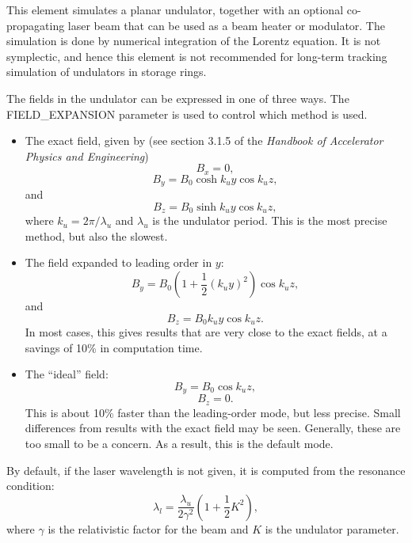 This element simulates a planar undulator, together with an optional
co-propagating laser beam that can be used as a beam heater or
modulator.  The simulation is done by numerical integration of the
Lorentz equation.  It is not symplectic, and hence this element is not
recommended for long-term tracking simulation of undulators in storage
rings.  

The fields in the undulator can be expressed in one of three ways.
The FIELD\_EXPANSION parameter is used to control which method is used.
\begin{itemize}
\item The exact field, given by (see section 3.1.5 of the {\em Handbook of
Accelerator Physics and Engineering})
\begin{equation}
B_x = 0,
\end{equation}
\begin{equation}
B_y = B_0 \cosh k_u y \cos k_u z,
\end{equation}
and
\begin{equation}
B_z = B_0 \sinh k_u y \cos k_u z ,
\end{equation}
where $k_u = 2\pi/\lambda_u$ and $\lambda_u$ is the undulator period.
This is the most precise method, but also the slowest.  

\item The field expanded to leading order in $y$:
\begin{equation}
B_y = B_0 ( 1 + \frac{1}{2}(k_u y)^2 ) \cos k_u z,
\end{equation}
and
\begin{equation}
B_z = B_0 k_u y \cos k_u z.
\end{equation}
In most cases, this gives results that are very close to the exact fields,
at a savings of 10\% in computation time.

\item The ``ideal'' field:
\begin{equation}
B_y = B_0 \cos k_u z,
\end{equation}
\begin{equation}
B_z = 0.
\end{equation}
This is about 10\% faster than the leading-order mode, but less
precise.  Small differences from results with the exact field may be
seen.  Generally, these are too small to be a concern.  As a result,
this is the default mode.
\end{itemize}

By default, if the laser wavelength is not given, it is computed from the resonance
condition:
\begin{equation}
\lambda_l = \frac{\lambda_u}{2 \gamma^2} \left( 1 + \frac{1}{2} K^2 \right),
\end{equation}
where $\gamma$ is the relativistic factor for the beam and $K$ is the
undulator parameter.

